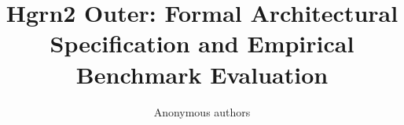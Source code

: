 \title{\textbf{Hgrn2 Outer: Formal Architectural Specification and Empirical Benchmark Evaluation}}

\author{Anonymous authors}
